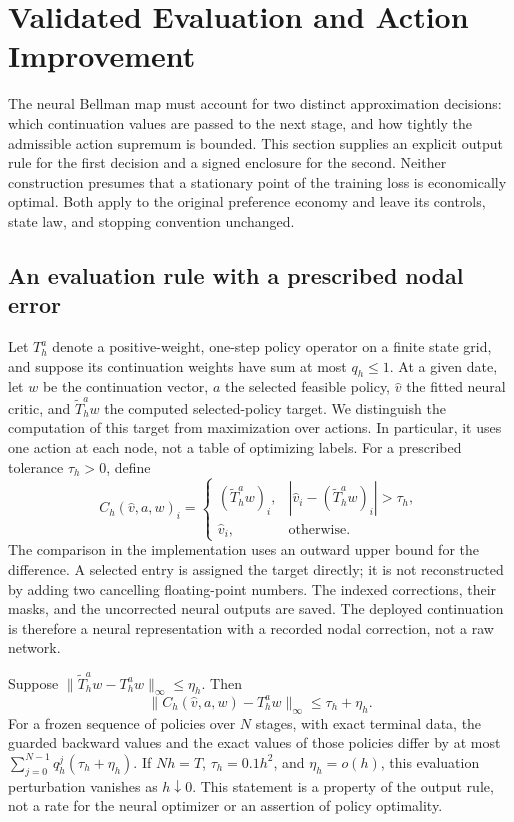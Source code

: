 \section{Validated Evaluation and Action Improvement}\label{sec:r9method}
The neural Bellman map must account for two distinct approximation decisions: which continuation values are passed to the next stage, and how tightly the admissible action supremum is bounded. This section supplies an explicit output rule for the first decision and a signed enclosure for the second. Neither construction presumes that a stationary point of the training loss is economically optimal. Both apply to the original preference economy and leave its controls, state law, and stopping convention unchanged.

\subsection{An evaluation rule with a prescribed nodal error}
Let $T_h^a$ denote a positive-weight, one-step policy operator on a finite state grid, and suppose its continuation weights have sum at most $q_h\leq1$. At a given date, let $w$ be the continuation vector, $a$ the selected feasible policy, $\widehat v$ the fitted neural critic, and $\widetilde T_h^a w$ the computed selected-policy target. We distinguish the computation of this target from maximization over actions. In particular, it uses one action at each node, not a table of optimizing labels. For a prescribed tolerance $\tau_h>0$, define
\begin{equation}\label{eq:r9guard}
 C_h(\widehat v,a,w)_i=
 \begin{cases}
  (\widetilde T_h^a w)_i,& |\widehat v_i-(\widetilde T_h^a w)_i|>\tau_h,\\
  \widehat v_i,&\text{otherwise}.
 \end{cases}
\end{equation}
The comparison in the implementation uses an outward upper bound for the difference. A selected entry is assigned the target directly; it is not reconstructed by adding two cancelling floating-point numbers. The indexed corrections, their masks, and the uncorrected neural outputs are saved. The deployed continuation is therefore a neural representation with a recorded nodal correction, not a raw network.

\begin{proposition}\label{prop:r9guard}
Suppose $\|\widetilde T_h^a w-T_h^a w\|_\infty\leq\eta_h$. Then
\[
 \|C_h(\widehat v,a,w)-T_h^a w\|_\infty\leq\tau_h+\eta_h.
\]
For a frozen sequence of policies over $N$ stages, with exact terminal data, the guarded backward values and the exact values of those policies differ by at most $\sum_{j=0}^{N-1}q_h^j(\tau_h+\eta_h)$.
If $N h=T$, $\tau_h=0.1h^2$, and $\eta_h=o(h)$, this evaluation perturbation vanishes as $h\downarrow0$. This statement is a property of the output rule, not a rate for the neural optimizer or an assertion of policy optimality.
\end{proposition}

